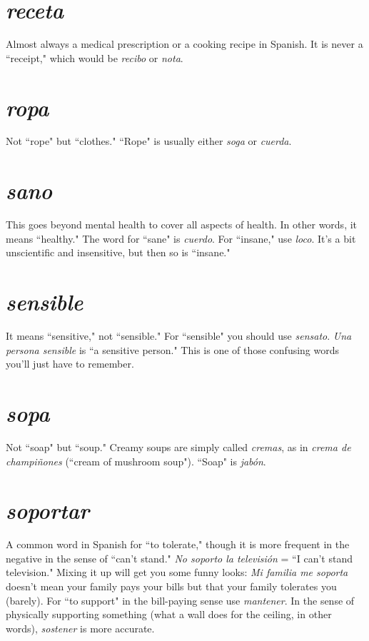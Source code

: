 \section{\emph{receta}}

Almost always a medical prescription or a cooking
recipe in Spanish. It is never a ``receipt," which would be \emph{recibo} or
\emph{nota}.

\section{\emph{ropa}}

Not ``rope" but ``clothes." ``Rope" is usually either
\emph{soga} or \emph{cuerda}.

\section{\emph{sano}}

This goes beyond mental health to cover all aspects of
health. In other words, it means ``healthy." The word for ``sane" is
\emph{cuerdo}. For ``insane," use \emph{loco}. It's a bit unscientific and insensitive, but then so is ``insane."

\section{\emph{sensible}}

It means ``sensitive," not ``sensible." For ``sensible" you should use \emph{sensato}. \emph{Una persona sensible} is ``a sensitive
person." This is one of those confusing words you'll just have to
remember.

\section{\emph{sopa}}

Not ``soap" but ``soup." Creamy soups are simply
called \emph{cremas}, as in \emph{crema de champiñones} (``cream of mushroom
soup"). ``Soap" is \emph{jabón}.

\section{\emph{soportar}}

A common word in Spanish for ``to tolerate,"
though it is more frequent in the negative in the sense of ``can't stand."
\emph{No soporto la televisión} = ``I can't stand television." Mixing it up will
get you some funny looks: \emph{Mi familia me soporta} doesn't mean your
family pays your bills but that your family tolerates you (barely). For
``to support" in the bill-paying sense use \emph{mantener}. In the sense of
physically supporting something (what a wall does for the ceiling, in
other words), \emph{sostener} is more accurate.

